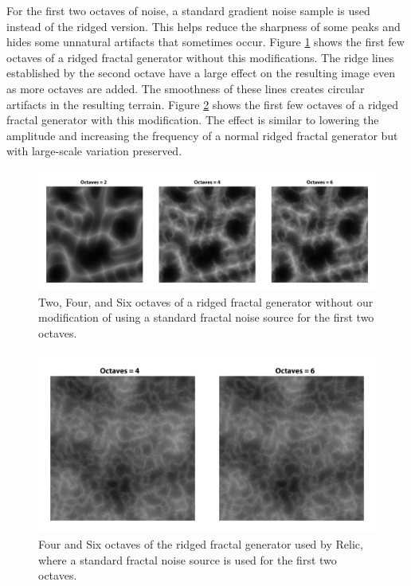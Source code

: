 For the first two octaves of noise, a standard gradient noise sample is used instead of the ridged version.
This helps reduce the sharpness of some peaks and hides some unnatural artifacts that sometimes occur.
Figure \ref{fig:original_ridged} shows the first few octaves of a ridged fractal generator without this modifications.
The ridge lines established by the second octave have a large effect on the resulting image even as more octaves are added.
The smoothness of these lines creates circular artifacts in the resulting terrain.
Figure \ref{fig:my_ridged} shows the first few octaves of a ridged fractal generator with this modification.
The effect is similar to lowering the amplitude and increasing the frequency of a normal ridged fractal generator but with large-scale variation preserved.

\begin{figure}
	\centering
		\includegraphics[width=1.0\textwidth]{figures/original_ridged}
	\caption{Two, Four, and Six octaves of a ridged fractal generator without our modification of using a standard fractal noise source for the first two octaves.}
	\label{fig:original_ridged}
\end{figure}

\begin{figure}
	\centering
		\includegraphics[width=1.0\textwidth]{figures/my_ridged}
	\caption{Four and Six octaves of the ridged fractal generator used by Relic, where a standard fractal noise source is used for the first two octaves.}
	\label{fig:my_ridged}
\end{figure}

